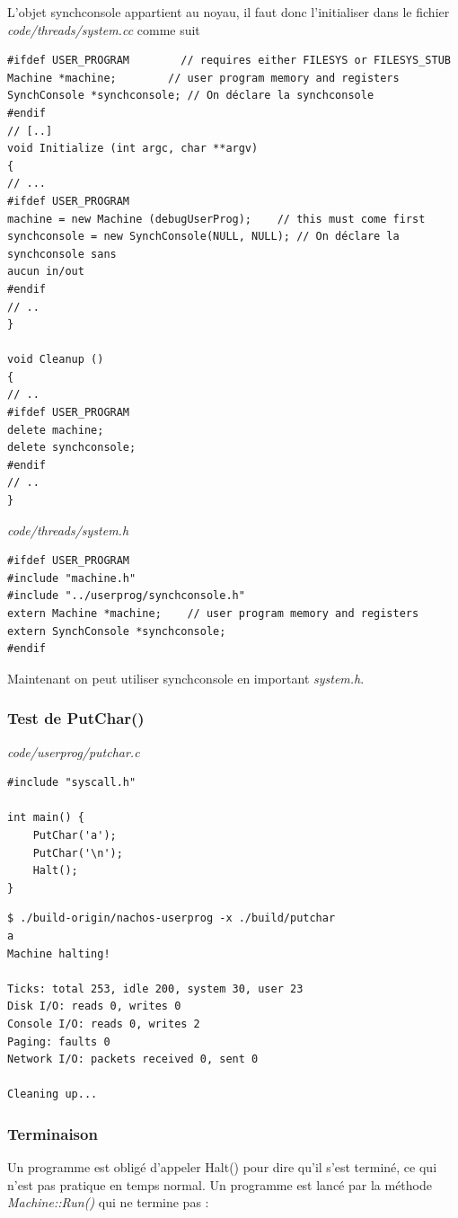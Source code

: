 \documentclass[a4paper,10pt]{article}
\begin{document}
L'objet synchconsole appartient au noyau, il faut donc l'initialiser dans le
fichier \textit{code/threads/system.cc} comme suit

\begin{lstlisting}
#ifdef USER_PROGRAM        // requires either FILESYS or FILESYS_STUB
Machine *machine;        // user program memory and registers
SynchConsole *synchconsole; // On déclare la synchconsole
#endif
// [..]
void Initialize (int argc, char **argv)
{
// ...
#ifdef USER_PROGRAM
machine = new Machine (debugUserProg);    // this must come first
synchconsole = new SynchConsole(NULL, NULL); // On déclare la synchconsole sans
aucun in/out
#endif
// ..
}

void Cleanup ()
{
// ..
#ifdef USER_PROGRAM
delete machine;
delete synchconsole;
#endif
// ..
}
\end{lstlisting}

\textit{code/threads/system.h}
\begin{lstlisting}
#ifdef USER_PROGRAM
#include "machine.h"
#include "../userprog/synchconsole.h"
extern Machine *machine;    // user program memory and registers
extern SynchConsole *synchconsole;
#endif
\end{lstlisting}

Maintenant on peut utiliser synchconsole en important \textit{system.h}.

\subsubsection{Test de PutChar()}

\textit{code/userprog/putchar.c}
\begin{lstlisting}
#include "syscall.h"

int main() {
    PutChar('a');
    PutChar('\n');
    Halt();
}
\end{lstlisting}

\begin{lstlisting}
$ ./build-origin/nachos-userprog -x ./build/putchar
a
Machine halting!

Ticks: total 253, idle 200, system 30, user 23
Disk I/O: reads 0, writes 0
Console I/O: reads 0, writes 2
Paging: faults 0
Network I/O: packets received 0, sent 0

Cleaning up...
\end{lstlisting}

\subsubsection{Terminaison}
Un programme est obligé d'appeler Halt() pour dire qu'il s'est terminé, ce qui
n'est pas pratique en temps normal. Un programme est lancé par la méthode
\textit{Machine::Run()} qui ne termine pas :
\end{document}
